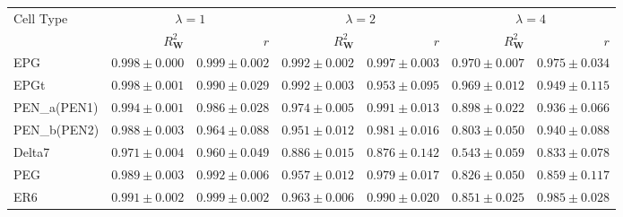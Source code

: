 \begin{tabular}{lrrrrrr}
\toprule
Cell Type & \multicolumn{2}{c}{$\lambda = 1$} & \multicolumn{2}{c}{$\lambda = 2$} & \multicolumn{2}{c}{$\lambda = 4$} \\
 & $R^2_{\mathbf{W}}$ & $r$ & $R^2_{\mathbf{W}}$ & $r$ & $R^2_{\mathbf{W}}$ & $r$ \\
\midrule
EPG & $0.998\pm0.000$ & $0.999\pm0.002$ & $0.992\pm0.002$ & $0.997\pm0.003$ & $0.970\pm0.007$ & $0.975\pm0.034$ \\
EPGt & $0.998\pm0.001$ & $0.990\pm0.029$ & $0.992\pm0.003$ & $0.953\pm0.095$ & $0.969\pm0.012$ & $0.949\pm0.115$ \\
PEN\_a(PEN1) & $0.994\pm0.001$ & $0.986\pm0.028$ & $0.974\pm0.005$ & $0.991\pm0.013$ & $0.898\pm0.022$ & $0.936\pm0.066$ \\
PEN\_b(PEN2) & $0.988\pm0.003$ & $0.964\pm0.088$ & $0.951\pm0.012$ & $0.981\pm0.016$ & $0.803\pm0.050$ & $0.940\pm0.088$ \\
Delta7 & $0.971\pm0.004$ & $0.960\pm0.049$ & $0.886\pm0.015$ & $0.876\pm0.142$ & $0.543\pm0.059$ & $0.833\pm0.078$ \\
PEG & $0.989\pm0.003$ & $0.992\pm0.006$ & $0.957\pm0.012$ & $0.979\pm0.017$ & $0.826\pm0.050$ & $0.859\pm0.117$ \\
ER6 & $0.991\pm0.002$ & $0.999\pm0.002$ & $0.963\pm0.006$ & $0.990\pm0.020$ & $0.851\pm0.025$ & $0.985\pm0.028$ \\
\bottomrule
\end{tabular}
